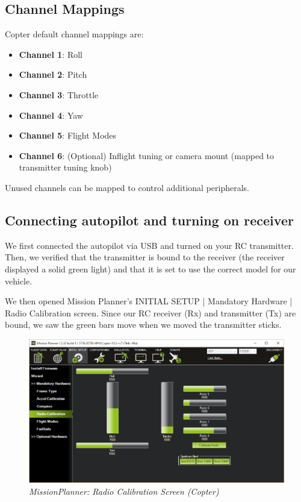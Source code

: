 \subsection{Channel Mappings}
Copter default channel mappings are:
\begin{itemize}
	\item \textbf{Channel 1}: Roll
	\item \textbf{Channel 2}: Pitch
	\item \textbf{Channel 3}: Throttle
	\item \textbf{Channel 4}: Yaw
	\item \textbf{Channel 5}: Flight Modes
	\item \textbf{Channel 6}: (Optional) Inflight tuning or camera mount (mapped to transmitter tuning knob)
\end{itemize}
Unused channels can be mapped to control additional peripherals.

\subsection{Connecting autopilot and turning on receiver}
We first connected the autopilot via USB and turned on your RC transmitter. Then, we verified that the transmitter is bound to the receiver (the receiver displayed a solid green light) and that it is set to use the correct model for our vehicle.

We then opened Mission Planner’s INITIAL SETUP | Mandatory Hardware | Radio Calibration screen. Since our RC receiver (Rx) and transmitter (Tx) are bound, we saw the green bars move when we moved the transmitter sticks.

\begin{figure}[h]
	\includegraphics[width=1.0\linewidth]{mp_radio_calibration}
	\centering
	\caption{\label{fig: mos_3}\textit{MissionPlanner: Radio Calibration Screen (Copter)}}
\end{figure}

